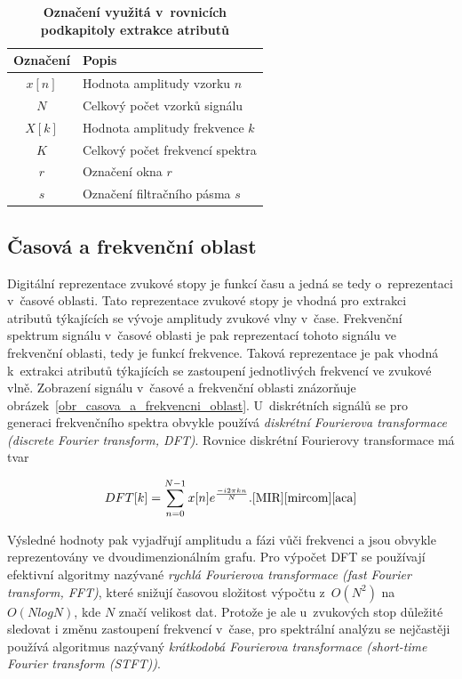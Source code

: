 \begin{table}[H]
	\vskip6pt
	\caption{\textbf{Označení využitá v~rovnicích podkapitoly extrakce atributů}}
    \vskip6pt
	\centering
    \begin{tabular}{c | l} 
        \textbf{Označení} & \textbf{Popis} \\ [0.5ex] 
        \hline\hline
        $x[n]$ & Hodnota amplitudy vzorku $n$\\
        \hline
        $N$ & Celkový počet vzorků signálu \\
        \hline
        $X[k]$ & Hodnota amplitudy frekvence $k$ \\
        \hline
        $K$ & Celkový počet frekvencí spektra\\
        \hline
        $r$ & Označení okna $r$ \\
        \hline
        $s$ & Označení filtračního pásma $s$ \\
        \hline\hline
    \end{tabular}
	\label{oznaceni_v_rovnicich_extrakce}
\end{table}

\subsection*{Časová a frekvenční oblast}
\label{casova_a_frekvencni_oblast}
Digitální reprezentace zvukové stopy je funkcí času a jedná se tedy o~reprezentaci v~časové oblasti. Tato reprezentace zvukové stopy je vhodná pro extrakci atributů týkajících se vývoje amplitudy zvukové vlny v~čase. Frekvenční spektrum signálu v~časové oblasti je pak reprezentací tohoto signálu ve frekvenční oblasti, tedy je funkcí frekvence. Taková reprezentace je pak vhodná k~extrakci atributů týkajících se zastoupení jednotlivých frekvencí ve zvukové vlně. Zobrazení signálu v~časové a frekvenční oblasti znázorňuje obrázek~\ref{obr_casova_a_frekvencni_oblast}. U~diskrétních signálů se pro generaci frekvenčního spektra obvykle používá \textit{diskrétní Fourierova transformace (discrete Fourier transform, DFT)}. Rovnice diskrétní Fourierovy transformace má tvar

\begin{equation}
	DFT[k] = \sum\limits_{n=0}^{N-1} x[n]e^{\frac{-i2\pi kn}{N}}.\text{\cite{MIR}\cite{mircom}\cite{aca}}
\end{equation}

\medskip

Výsledné hodnoty pak vyjadřují amplitudu a fázi vůči frekvenci a jsou obvykle reprezentovány ve dvoudimenzionálním grafu. Pro výpočet DFT se používají efektivní algoritmy nazývané \textit{rychlá Fourierova transformace (fast Fourier transform, FFT)}, které snižují časovou složitost výpočtu z~$O(N^2)$ na $O(N log N)$, kde $N$ značí velikost dat. Protože je ale u~zvukových stop důležité sledovat i změnu zastoupení frekvencí v~čase, pro spektrální analýzu se nejčastěji používá algoritmus nazývaný \textit{krátkodobá Fourierova transformace (short-time Fourier transform (STFT))}.\cite{MIR}\cite{mircom}\cite{aca}

